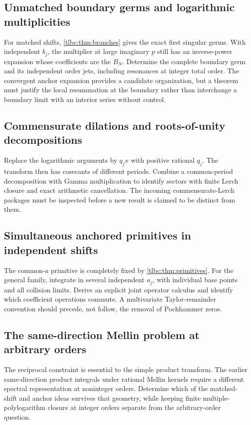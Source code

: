 \documentclass[11pt,letterpaper]{article}
\numberwithin{equation}{section}
\theoremstyle{definition}\newtheorem{definition}[theorem]{Definition}
\theoremstyle{remark}\newtheorem{remark}[theorem]{Remark}
\begin{document}
\subsection{Unmatched boundary germs and logarithmic multiplicities}
For matched shifts, \cref{tlbc:thm:branches} gives the exact first singular germs. With independent $b_j$, the multiplier at large imaginary $p$ still has an inverse-power expansion whose coefficients are the $B_N$. Determine the complete boundary germ and its independent order jets, including resonances at integer total order. The convergent anchor expansion provides a candidate organization, but a theorem must justify the local resummation at the boundary rather than interchange a boundary limit with an interior series without control.

\subsection{Commensurate dilations and roots-of-unity decompositions}
Replace the logarithmic arguments by $q_jx$ with positive rational $q_j$. The transform then has cosecants of different periods. Combine a common-period decomposition with Gamma multiplication to identify sectors with finite Lerch closure and exact arithmetic cancellation. The incoming commensurate-Lerch packages must be inspected before a new result is claimed to be distinct from them.

\subsection{Simultaneous anchored primitives in independent shifts}
The common-$a$ primitive is completely fixed by \cref{tlbc:thm:primitives}. For the general family, integrate in several independent $a_j$, with individual base points and all collision limits. Derive an explicit joint operator calculus and identify which coefficient operations commute. A multivariate Taylor-remainder convention should precede, not follow, the removal of Pochhammer zeros.

\subsection{The same-direction Mellin problem at arbitrary orders}
The reciprocal constraint is essential to the simple product transform. The earlier same-direction product integrals under rational Mellin kernels require a different spectral representation at noninteger orders. Determine which of the matched-shift and anchor ideas survives that geometry, while keeping finite multiple-polylogarithm closure at integer orders separate from the arbitrary-order question.
\end{document}
